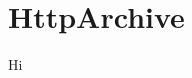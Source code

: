 \documentclass[JSraport_v01.tex]{subfiles}
\begin{document}
\section{HttpArchive}

Hi
\end{document}
